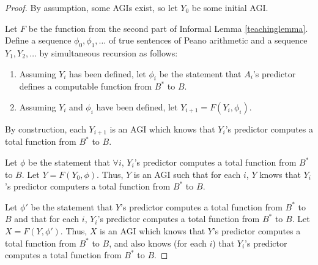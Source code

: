 \documentclass{article}
\begin{document}
\begin{proof}
    By assumption, some AGIs exist, so let $Y_0$ be some initial AGI.

    Let $F$ be the function from the second part of Informal Lemma \ref{teachinglemma}.
    Define a sequence $\phi_0,\phi_1,\ldots$ of true sentences of Peano arithmetic and
    a sequence $Y_1,Y_2,\ldots$ by simultaneous recursion as follows:
    \begin{enumerate}
        \item
        Assuming $Y_i$ has been defined,
        let $\phi_i$ be the statement that $A_i$'s predictor defines a computable
        function from $B^*$ to $B$.
        \item
        Assuming $Y_{i}$ and $\phi_{i}$ have been defined,
        let $Y_{i+1}=F(Y_{i},\phi_{i})$.
    \end{enumerate}
    By construction, each $Y_{i+1}$ is an AGI which
    knows that $Y_i$'s predictor computes a total function from $B^*$ to $B$.

    Let $\phi$ be the statement that $\forall i$, $Y_i$'s predictor computes a total
    function from $B^*$ to $B$.
    Let $Y=F(Y_0,\phi)$.
    Thus, $Y$ is an AGI such that for each $i$, $Y$ knows that $Y_i$'s predictor
    computers a total function from $B^*$ to $B$.

    Let $\phi'$ be the statement that $Y$'s predictor computes a total function
    from $B^*$ to $B$ and that for each $i$, $Y_i$'s predictor computes a total
    function from $B^*$ to $B$.
    Let $X=F(Y,\phi')$.
    Thus, $X$ is an AGI which knows that $Y$'s predictor computes a total function from
    $B^*$ to $B$, and also knows (for each $i$) that $Y_i$'s predictor computes a total
    function from $B^*$ to $B$.


\end{proof}
\end{document}
